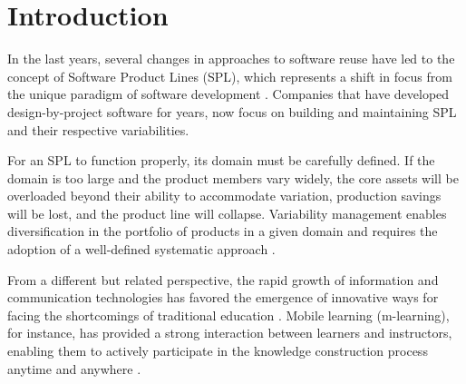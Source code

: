 \section{Introduction}


In the last years, several changes in approaches to software reuse have led to the concept of Software Product Lines (SPL), which represents a shift in focus from the unique paradigm of software development \cite{vanderlinden07}. Companies that have developed design-by-project software for years, now focus on building and maintaining SPL and their respective variabilities. 

\begin{comment}
Thus, models for representing variabilities are specified as part of the core assets of an SPL, and their correct identification, specification, and representation provide various development benefits. \cite{chen11,capilla13}.
\end{comment}

\begin{comment}Some of these approaches can be used in Domain Engineering (DE) and Application Engineering (AE) to support the selection and delimitation of the variant artifacts from different products \end{comment} 
For an SPL to function properly, its domain must be carefully defined. If the domain is too large and the product members vary widely, the core assets will be overloaded beyond their ability to accommodate variation, production savings will be lost, and the product line will collapse. Variability management enables diversification in the portfolio of products in a given domain and requires the adoption of a well-defined systematic approach \cite{bockle05,vanderlinden07}.

\begin{comment}On the other hand, if the domain is very small, the core assets may not be constructed generically enough to accommodate future growth and the product line will be stagnant, i.e., domain savings will never be achieved and all potential return of investment (ROI) will never materialize
\end{comment}

From a different but related perspective, the rapid growth of information and communication technologies has favored the emergence of innovative ways for facing the shortcomings of traditional education \cite{west12}. Mobile learning (m-learning), for instance, has provided a strong interaction between learners and instructors, enabling them to actively participate in the knowledge construction process anytime and anywhere \cite{moreira2018special,kukulska05}. 

